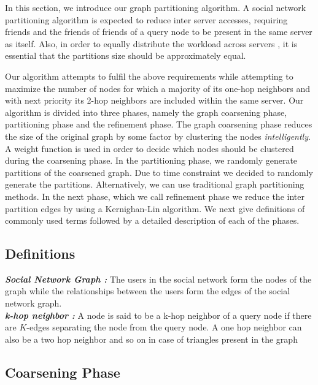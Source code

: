\documentclass[letterpaper]{article}
\begin{document}
In this section, we introduce our graph partitioning algorithm. A social
network  partitioning algorithm is expected to reduce inter server accesses,
requiring friends and the friends of friends of a query node to be present in
the same server as itself.   Also, in order to equally distribute the workload
across servers , it is essential that the partitions size should be
approximately equal.


 Our algorithm attempts to fulfil the above requirements
while attempting to maximize the number of nodes for which a majority of its
one-hop neighbors and with next priority its 2-hop neighbors are included
within the same server.  Our algorithm is divided into three
phases, namely the graph coarsening phase, partitioning phase and the
refinement phase. The graph coarsening phase reduces the size of the original
graph by some factor by clustering the nodes \emph{intelligently}.  A weight
function is used in order to decide which nodes should be clustered  during the
coarsening phase. In the partitioning phase, we randomly generate partitions of
the coarsened graph. Due to time constraint we decided to randomly generate the
partitions. Alternatively, we can use traditional graph partitioning methods.
In the next phase, which we call refinement phase we reduce the inter partition
edges by using a Kernighan-Lin algorithm. We next give definitions of commonly
used terms followed by a detailed description of each of the phases.

\subsection{Definitions}
\textbf {\it{Social Network Graph :} }The users in the social network form the
nodes of the graph while the relationships between the users form the edges of
the social network graph.\\ \textbf{\it{k-hop neighbor :}} A node is said to be
a k-hop neighbor of a query node if there are  $K$-edges separating the node
from the query node. A one hop neighbor can also be a two hop neighbor and so
on in case of triangles present in the graph

\subsection{Coarsening Phase}
\end{document}
